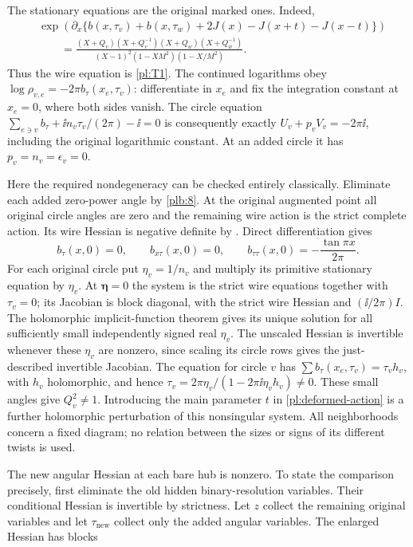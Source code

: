 The stationary equations are the original marked ones. Indeed,
\[
 \begin{aligned}
 &\exp\!\left(\partial_x\{b(x,\tau_v)+b(x,\tau_w)
             +2J(x)-J(x+t)-J(x-t)\}\right)\\
 &\qquad=\frac{(X+Q_v)(X+Q_v^{-1})(X+Q_w)(X+Q_w^{-1})}
 {(X-1)^2(1-XM^2)(1-X/M^2)}.
 \end{aligned}
\]
Thus the wire equation is \eqref{pl:T1}. The continued logarithms obey
$\log\rho_{v,e}=-2\pi b_\tau(x_e,\tau_v)$: differentiate in $x_e$
and fix the integration constant at $x_e=0$, where both sides vanish.
The circle equation
$\sum_{e\ni v}b_\tau+\ii n_v\tau_v/(2\pi)-\ii=0$
is consequently exactly $U_v+p_vV_v=-2\pi\ii$, including the original
logarithmic constant. At an added circle it has $p_v=n_v=\epsilon_v=0$.

Here the required nondegeneracy can be checked entirely classically.
Eliminate each added zero-power angle by \eqref{plb:8}. At the original
augmented point all original circle angles are zero and the remaining
wire action is the strict complete action. Its wire Hessian is negative
definite by \cite[Theorem 6.4]{Newton}. Direct differentiation gives
\[
 b_\tau(x,0)=0,\qquad b_{x\tau}(x,0)=0,\qquad
 b_{\tau\tau}(x,0)=-\frac{\tan\pi x}{2\pi}.
\]
For each original circle put $\eta_v=1/n_v$ and multiply its primitive stationary
equation by $\eta_v$. At $\boldsymbol\eta=0$ the system is the strict
wire equations together with $\tau_v=0$; its Jacobian is block diagonal,
with the strict wire Hessian and $(\ii/2\pi)I$. The holomorphic
implicit-function theorem gives its unique solution for all sufficiently
small independently signed real $\eta_v$. The unscaled Hessian is
invertible whenever these $\eta_v$ are nonzero, since scaling its circle
rows gives the just-described invertible Jacobian. The equation for
circle $v$ has $\sum b_\tau(x_e,\tau_v)=\tau_v h_v$, with $h_v$
holomorphic, and hence
$\tau_v=2\pi\eta_v/(1-2\pi\ii\eta_v h_v)\ne0$.
These small angles give $Q_v^2\ne1$. Introducing the main parameter
$t$ in \eqref{pl:deformed-action} is a further holomorphic perturbation
of this nonsingular system. All neighborhoods concern a fixed diagram;
no relation between the sizes or signs of its different twists is used.

The new angular Hessian at each bare hub is nonzero. To state the
comparison precisely, first eliminate the old hidden binary-resolution
variables. Their conditional Hessian is invertible by strictness.
Let \(z\) collect the remaining original variables and let
\(\tau_{\mathrm{new}}\) collect only the added angular variables.
The enlarged Hessian has blocks

